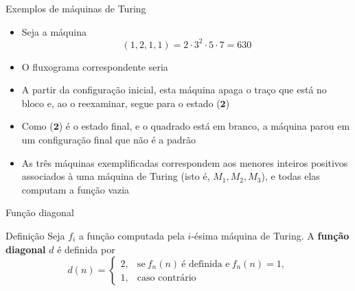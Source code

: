 \begin{frame}[fragile]{Exemplos de máquinas de Turing}

    \begin{itemize}
        \item Seja a máquina 
        \[
            (1, 2, 1, 1) = 2\cdot 3^2\cdot 5\cdot 7 = 630
        \]

        \item O fluxograma correspondente seria

    \begin{figure}[h]
        \centering
    \end{figure}

        \item A partir da configuração inicial, esta máquina apaga o traço que está no bloco e,
            ao o reexaminar, segue para o estado ($\mathbf{2}$)

        \item Como ($\mathbf{2}$) é o estado final, e o quadrado está em branco, a máquina parou
            em um configuração final que não é a padrão

        \item As três máquinas exemplificadas correspondem aos menores inteiros positivos 
            associados à uma máquina de Turing (isto é, $M_1, M_2, M_3$), e todas elas computam
            a função vazia 
    \end{itemize}

\end{frame}

\begin{frame}[fragile]{Função diagonal}

    \begin{block}{Definição}
        Seja $f_i$ a função computada pela $i$-ésima máquina de Turing. A \textbf{função diagonal}
        $d$ é definida por
        \[
            d(n) = \left\lbrace \begin{array}{ll}
                2,& \mbox{se}\ f_n(n)\ \mbox{é definida e}\ f_n(n) = 1, \\
                1,& \mbox{caso contrário}
            \end{array}\right.
        \]
    \end{block}

\end{frame}

